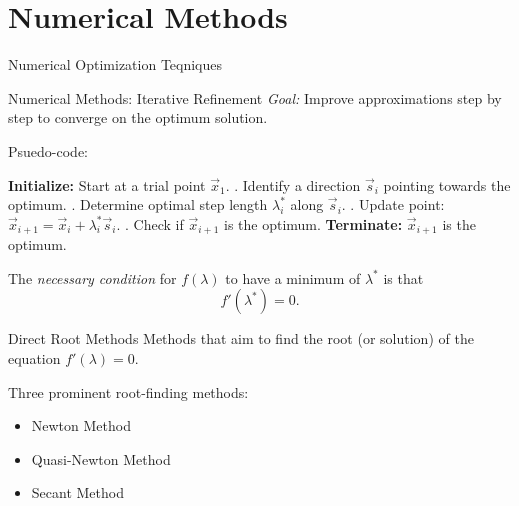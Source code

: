 \documentclass[
    NAME={Dr. Helga Ingimundardóttir},
    EMAIL={helgaingim@hi.is},
    FACULTY={Industrial Engineering},
    TITLE={Nonlinear Optimization},
    SUBTITLE={Approaches and Challenges},
    SEMINAR={VÉL113F},
    DATE={Design and Optimization}
]{../HI-latex/hi-beamer}
\begin{document}
    \section{Numerical Methods}
    \begin{frame}{Numerical Optimization Teqniques}

        \begin{block}{Numerical Methods: Iterative Refinement}
            \emph{Goal:} Improve approximations step by step to converge on the optimum solution.
        \end{block}

        \alert{Psuedo-code:}
        \begin{algorithmic}
            \State \textbf{Initialize:} Start at a trial point \( \vec{x}_1 \).
                . Identify a direction \( \vec{s}_i \) pointing towards the optimum.
                . Determine optimal step length \( \lambda_i^* \) along \( \vec{s}_i \).
                . Update point: \( \vec{x}_{i+1} = \vec{x}_i + \lambda_i^* \vec{s}_i \).
                . Check if \( \vec{x}_{i+1} \) is the optimum.
            \EndWhile
            \State \textbf{Terminate:} \( \vec{x}_{i+1} \) is the optimum.
        \end{algorithmic}

        \framebreak
        The \emph{necessary condition} for \( f(\lambda) \) to have a minimum of \( \lambda^* \) is that \[ f'(\lambda^*
        ) = 0. \]

        \begin{block}{Direct Root Methods}
            Methods that aim to find the root (or solution) of the equation \( f'(\lambda) = 0 \).
        \end{block}

        Three prominent root-finding methods:
        \begin{itemize}
            \item Newton Method
            \item Quasi-Newton Method
            \item Secant Method
        \end{itemize}
    \end{frame}
\end{document}
